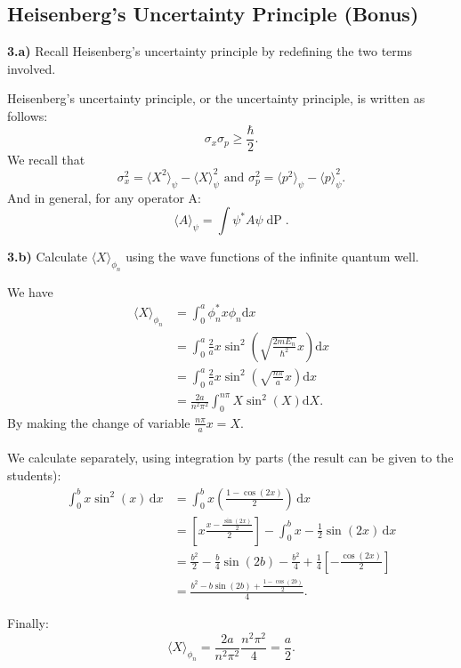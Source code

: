 \subsection{Heisenberg's Uncertainty Principle (Bonus)}

\noindent \textbf{3.a)} Recall Heisenberg's uncertainty principle by redefining the two terms involved.\\

\begin{breakbox}
    \noindent Heisenberg's uncertainty principle, or the uncertainty principle, is written as follows:
    \[
        \boxed{\sigma_x\sigma_p \ge \frac{\hbar}{2}.}
    \]
    \noindent We recall that  
    $$\sigma_x^2 = \langle X^2 \rangle_{\psi} - \langle X \rangle_{\psi}^2 \text{ and } \sigma_p^2 = \langle p^2 \rangle_{\psi} - \langle p \rangle_{\psi}^2.$$
    \noindent And in general, for any operator A: 
    $$\boxed{\langle A \rangle_{\psi} = \int \psi^* A \psi \operatorname{dP}.}$$
\end{breakbox}

\medskip

\noindent \textbf{3.b)} Calculate $\langle X \rangle_{\phi_n}$ using the wave functions of the infinite quantum well. \\

\begin{breakbox}
    \noindent We have
    \begin{align*}
        \langle X \rangle_{\phi_n} &= \int_{0}^{a} \phi_n^{*} x \phi_n \mathrm{d}x \\
        &= \int_{0}^{a} \frac{2}{a}x\sin^{2}\left(\sqrt{\frac{2mE_n}{\hbar^2}}x\right) \mathrm{d}x \\
        &= \int_{0}^{a} \frac{2}{a}x\sin^{2}\left(\sqrt{\frac{n\pi}{a}}x\right) \mathrm{d}x \\
        &= \frac{2a}{n^2\pi^2} \int_{0}^{n\pi} X \sin^{2}(X) \mathrm{d}X.
    \end{align*}
    \noindent By making the change of variable $\displaystyle \frac{n\pi}{a}x = X$.\\ \\
    \noindent We calculate separately, using integration by parts (the result can be given to the students):
    \begin{align*}
        \int_{0}^{b} x\sin^{2}(x) \, \mathrm{d}x &= \int_{0}^{b} x\left(\frac{1-\cos(2x)}{2}\right) \, \mathrm{d}x \\
        &= \left[x \frac{x - \frac{\sin(2x)}{2}}{2}\right] - \int_{0}^{b} x - \frac{1}{2}\sin(2x) \, \mathrm{d}x \\
        &= \frac{b^2}{2} -\frac{b}{4}\sin(2b) - \frac{b^2}{4} +\frac{1}{4}\left[-\frac{\cos(2x)}{2}\right

] \\
        &= \frac{b^2 - b\sin(2b) + \frac{1-\cos(2b)}{2}}{4}.
    \end{align*}

    \noindent Finally:
    $$\boxed{\langle X \rangle_{\phi_n} = \frac{2a}{n^2\pi^2}\frac{n^2\pi^2}{4} = \frac{a}{2}.}$$
\end{breakbox}

